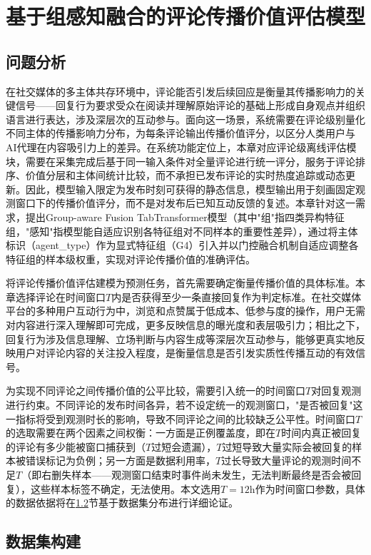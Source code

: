 \chapter{基于组感知融合的评论传播价值评估模型}

\section{问题分析}

在社交媒体的多主体共存环境中，评论能否引发后续回应是衡量其传播影响力的关键信号——回复行为要求受众在阅读并理解原始评论的基础上形成自身观点并组织语言进行表达，涉及深层次的互动参与。面向这一场景，系统需要在评论级别量化不同主体的传播影响力分布，为每条评论输出传播价值评分，以区分人类用户与AI代理在内容吸引力上的差异。在系统功能定位上，本章对应评论级离线评估模块，需要在采集完成后基于同一输入条件对全量评论进行统一评分，服务于评论排序、价值分层和主体间统计比较，而不承担已发布评论的实时热度追踪或动态更新。因此，模型输入限定为发布时刻可获得的静态信息，模型输出用于刻画固定观测窗口下的传播价值评分，而不是对发布后已知互动反馈的复述。本章针对这一需求，提出Group-aware Fusion TabTransformer模型（其中"组"指四类异构特征组，"感知"指模型能自适应识别各特征组对不同样本的重要性差异），通过将主体标识（agent\_type）作为显式特征组（G4）引入并以门控融合机制自适应调整各特征组的样本级权重，实现对评论传播价值的准确评估。

将评论传播价值评估建模为预测任务，首先需要确定衡量传播价值的具体标准。本章选择评论在时间窗口$T$内是否获得至少一条直接回复作为判定标准。在社交媒体平台的多种用户互动行为中，浏览和点赞属于低成本、低参与度的操作，用户无需对内容进行深入理解即可完成，更多反映信息的曝光度和表层吸引力；相比之下，回复行为涉及信息理解、立场判断与内容生成等深层次互动参与，能够更真实地反映用户对评论内容的关注投入程度，是衡量信息是否引发实质性传播互动的有效信号。

为实现不同评论之间传播价值的公平比较，需要引入统一的时间窗口$T$对回复观测进行约束。不同评论的发布时间各异，若不设定统一的观测窗口，"是否被回复"这一指标将受到观测时长的影响，导致不同评论之间的比较缺乏公平性。时间窗口$T$的选取需要在两个因素之间权衡：一方面是正例覆盖度，即在$T$时间内真正被回复的评论有多少能被窗口捕获到（$T$过短会遗漏），$T$过短导致大量实际会被回复的样本被错误标记为负例；另一方面是数据利用率，$T$过长导致大量评论的观测时间不足$T$（即右删失样本——观测窗口结束时事件尚未发生，无法判断最终是否会被回复），这些样本标签不确定，无法使用。本文选用$T=12\text{h}$作为时间窗口参数，具体的数据依据将在\ref{sec:dataset}节基于数据集分布进行详细论证。

\section{数据集构建}
\label{sec:dataset}

